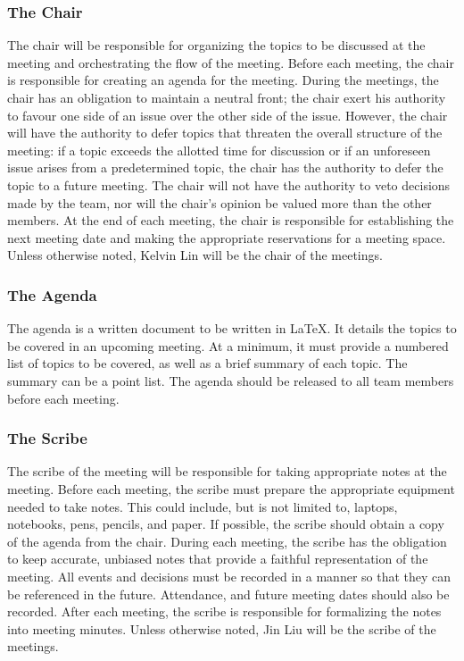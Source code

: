 \documentclass{article}
\begin{document}
\subsubsection{The Chair}
The chair will be responsible for organizing the topics to be discussed at the 
meeting and orchestrating the flow of the meeting. Before each meeting, the 
chair is responsible for creating an agenda for the meeting. During the 
meetings, the chair has an obligation to maintain a neutral front; the chair 
exert his authority to favour one side of an issue over the other side of the 
issue. However, the chair will have the authority to defer topics that threaten 
the overall structure of the meeting: if a topic exceeds the allotted time for 
discussion or if an unforeseen issue arises from a predetermined topic, the 
chair has the authority to defer the topic to a future meeting. The chair will 
not have the authority to veto decisions made by the team, nor will the chair's 
opinion be valued more than the other members. At the end of each meeting, the 
chair is responsible for establishing the next meeting date and making the 
appropriate reservations for a meeting space. Unless otherwise noted, Kelvin Lin 
will be the chair of the meetings.

\subsubsection{The Agenda}
The agenda is a written document to be written in \LaTeX. It details the topics 
to be covered in an upcoming meeting. At a minimum, it must provide a numbered 
list of topics to be covered, as well as a brief summary of each topic. The 
summary can be a point list. The agenda should be released to all team members 
before each meeting.

\subsubsection{The Scribe}
The scribe of the meeting will be responsible for taking appropriate notes at 
the meeting. Before each meeting, the scribe must prepare the appropriate 
equipment needed to take notes. This could include, but is not limited to, 
laptops, notebooks, pens, pencils, and paper. If possible, the scribe should 
obtain a copy of the agenda from the chair. During each meeting, the scribe has 
the obligation to keep accurate, unbiased notes that provide a faithful 
representation of the meeting. All events and decisions must be recorded in a 
manner so that they can be referenced in the future. Attendance, and future 
meeting dates should also be recorded. After each meeting, the scribe is 
responsible for formalizing the notes into meeting minutes. Unless otherwise 
noted, Jin Liu will be the scribe of the meetings.
\end{document}
